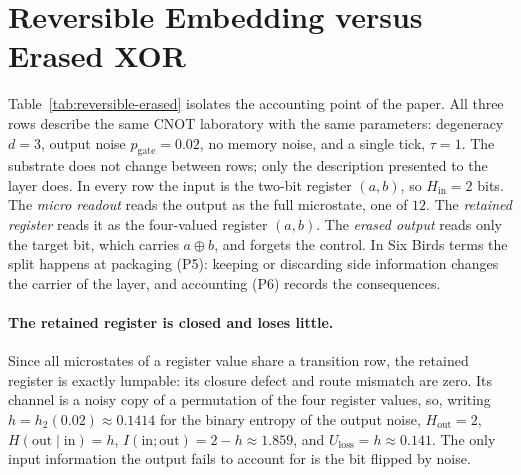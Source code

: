 \section{Reversible Embedding versus Erased XOR}
\label{sec:results-reversible}

Table~\ref{tab:reversible-erased} isolates the accounting point of the paper. All three rows describe the same CNOT laboratory with the same parameters: degeneracy \(d=3\), output noise \(p_{\mathrm{gate}}=0.02\), no memory noise, and a single tick, \(\tau=1\). The substrate does not change between rows; only the description presented to the layer does. In every row the input is the two-bit register \((a,b)\), so \(H_{\mathrm{in}}=2\) bits. The \emph{micro readout} reads the output as the full microstate, one of \(12\). The \emph{retained register} reads it as the four-valued register \((a,b)\). The \emph{erased output} reads only the target bit, which carries \(a\oplus b\), and forgets the control. In Six Birds terms the split happens at packaging (P5): keeping or discarding side information changes the carrier of the layer, and accounting (P6) records the consequences.

\begin{table}[t]
    \centering
    \caption{Three views of one CNOT laboratory (\(p_{\mathrm{gate}}=0.02\), \(p_{\mathrm{mem}}=0\), \(\tau=1\), \(d=3\)). The input is the two-bit register in every row, so \(H_{\mathrm{in}}=2\) bits. \(\Delta\) is the closure defect for a point-mass probe on a microstate with register value \((1,0)\); for the erased output this probe attains the worst case of Lemma~\ref{lem:worst-case-defect}. RM uses stationary weights. EPR is the stationary entropy-production rate of the micro-kernel for the micro readout and the apparent rate for the two coarse views, in nats per step. Entries shown as \(0\) are exactly zero; the frozen floating-point values are below \(10^{-15}\).}
    \label{tab:reversible-erased}
    
\end{table}

\paragraph{The retained register is closed and loses little.}
Since all microstates of a register value share a transition row, the retained register is exactly lumpable: its closure defect and route mismatch are zero. Its channel is a noisy copy of a permutation of the four register values, so, writing \(h=h_2(0.02)\approx 0.1414\) for the binary entropy of the output noise, \(H_{\mathrm{out}}=2\), \(H(\mathrm{out}\mid\mathrm{in})=h\), \(I(\mathrm{in};\mathrm{out})=2-h\approx 1.859\), and \(U_{\mathrm{loss}}=h\approx 0.141\). The only input information the output fails to account for is the bit flipped by noise.

